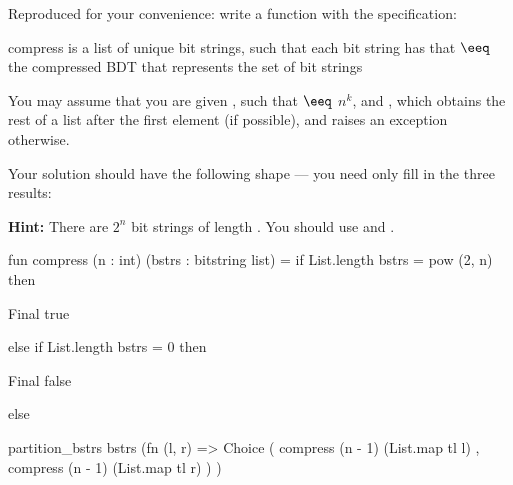 \begin{parts}
    \newpage

    Reproduced for your convenience: write a function  with the
    specification:

    \spec
      {compress}
      {}
      { is a list of unique bit strings, such that each bit string  has
      that }
      { $\eeq$ the compressed BDT that
      represents the set of bit strings }

    You may assume that you are given , such that
     $\eeq$ $n^k$, and , which
    obtains the rest of a list after the first element (if possible), and raises an exception otherwise.

    Your solution should have the following shape --- you need only fill in the
    three results:

    \textbf{Hint:} There are $2^n$ bit strings of length . You should use
     and .

    \begin{codeblock}
      fun compress (n : int) (bstrs : bitstring list) =
        if List.length bstrs = pow (2, n) then
    \end{codeblock}
    \begin{solutionorbox}[5em]
      \begin{codeblock}
        Final true
      \end{codeblock}
    \end{solutionorbox}

    \begin{codeblock}[autogobble=false]
  else if List.length bstrs = 0 then
    \end{codeblock}

    \begin{solutionorbox}[5em]
      \begin{codeblock}
        Final false
      \end{codeblock}
    \end{solutionorbox}

    \begin{codeblock}[autogobble=false]
  else
    \end{codeblock}

    \begin{solutionorbox}[20em]
      \begin{codeblock}
            partition_bstrs bstrs (fn (l, r) =>
              Choice
                ( compress (n - 1) (List.map tl l)
                , compress (n - 1) (List.map tl r)
                )
            )
      \end{codeblock}
    \end{solutionorbox}


\end{parts}
